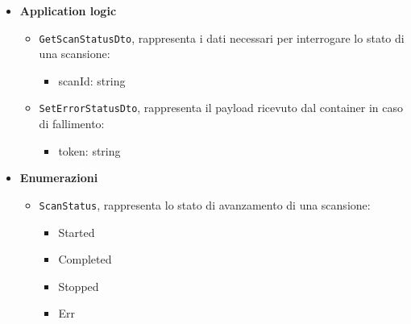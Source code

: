 \documentclass[a4paper, 11pt]{article}
\newcounter{subsubsubsection}[subsubsection]
\newcounter{subsubsubsubsection}[subsubsubsection]
\begin{document}
\newpage
{}

\begin{itemize}
  \item \textbf{Application logic}
      \begin{itemize}
          \item \texttt{GetScanStatusDto}, rappresenta i dati necessari per interrogare lo stato di una scansione:
          \begin{itemize}
                \item scanId: string
            \end{itemize}
      \item \texttt{SetErrorStatusDto}, rappresenta il payload ricevuto dal container in caso di fallimento:
          \begin{itemize}
                \item token: string
            \end{itemize}
      \end{itemize}

  \item \textbf{Enumerazioni}
    \begin{itemize}
        \item \texttt{ScanStatus}, rappresenta lo stato di avanzamento di una scansione:
        \begin{itemize}
            \item Started
            \item Completed
            \item Stopped
            \item Err
        \end{itemize}
    \end{itemize}
\end{itemize}

\end{document}

